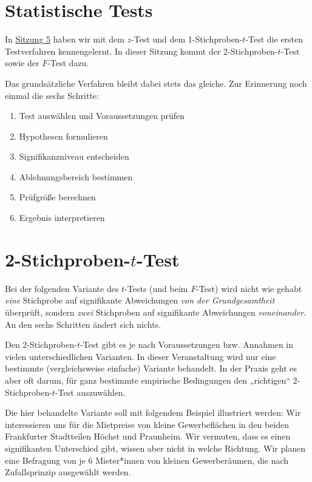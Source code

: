 \documentclass[
  11pt,
  ngerman,
  a4paper,
]{report}
\providecommand{\tightlist}{%
  \setlength{\itemsep}{0pt}\setlength{\parskip}{0pt}}
\begin{document}
\hypertarget{statistische-tests-1}{%
\section{Statistische Tests}\label{statistische-tests-1}}

In \href{grundlagen-der-teststatistik.html}{Sitzung 5} haben wir mit dem \(z\)-Test und dem 1-Stichproben-\(t\)-Test die ersten Testverfahren kennengelernt. In dieser Sitzung kommt der 2-Stichproben-\(t\)-Test sowie der \(F\)-Test dazu.

Das grundsätzliche Verfahren bleibt dabei stets das gleiche. Zur Erinnerung noch einmal die sechs Schritte:

\begin{enumerate}
\def\labelenumi{\arabic{enumi}.}
\tightlist
\item
  Test auswählen und Voraussetzungen prüfen
\item
  Hypothesen formulieren
\item
  Signifikanzniveau entscheiden
\item
  Ablehnungsbereich bestimmen
\item
  Prüfgröße berechnen
\item
  Ergebnis interpretieren
\end{enumerate}

\hypertarget{t2-test}{%
\section{\texorpdfstring{2-Stichproben-\(t\)-Test}{2-Stichproben-t-Test}}\label{t2-test}}

Bei der folgenden Variante des \(t\)-Tests (und beim \(F\)-Test) wird nicht wie gehabt \emph{eine} Stichprobe auf signifikante Abweichungen \emph{von der Grundgesamtheit} überprüft, sondern \emph{zwei} Stichproben auf signifikante Abweichungen \emph{voneinander.} An den sechs Schritten ändert sich nichts.

Den 2-Stichproben-\(t\)-Test gibt es je nach Voraussetzungen bzw. Annahmen in vielen unterschiedlichen Varianten. In dieser Veranstaltung wird nur eine bestimmte (vergleichsweise einfache) Variante behandelt. In der Praxis geht es aber oft darum, für ganz bestimmte empirische Bedingungen den „richtigen`` 2-Stichproben-\(t\)-Test auszuwählen.

Die hier behandelte Variante soll mit folgendem Beispiel illustriert werden: Wir interessieren uns für die Mietpreise von kleine Gewerbeflächen in den beiden Frankfurter Stadtteilen Höchst und Praunheim. Wir vermuten, dass es einen signifikanten Unterschied gibt, wissen aber nicht in welche Richtung. Wir planen eine Befragung von je 6 Mieter*innen von kleinen Gewerberäumen, die nach Zufallsprinzip ausgewählt werden.
\end{document}
